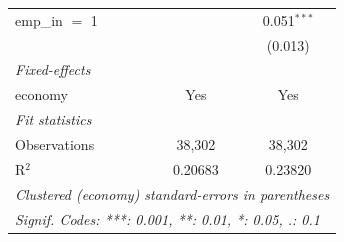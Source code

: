 \begin{table}[htbp]
\begin{tabular}{lcc}
      emp\_in $=$ 1       &                                & 0.051$^{***}$\\   
                          &                                & (0.013)\\   
      \midrule
      \emph{Fixed-effects}\\
      economy             & Yes                            & Yes\\  
      \midrule
      \emph{Fit statistics}\\
      Observations        & 38,302                         & 38,302\\  
      R$^2$               & 0.20683                        & 0.23820\\  
      \midrule \midrule
      \multicolumn{3}{l}{\emph{Clustered (economy) standard-errors in parentheses}}\\
      \multicolumn{3}{l}{\emph{Signif. Codes: ***: 0.001, **: 0.01, *: 0.05, .: 0.1}}\\
   \end{tabular}
\end{table}


